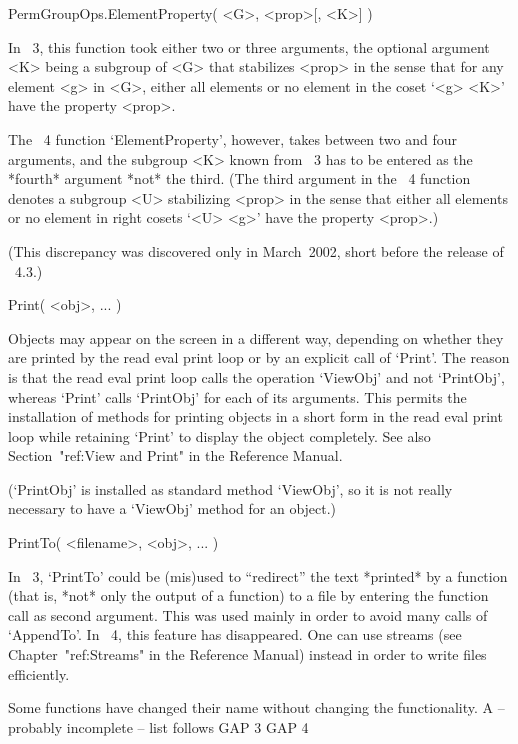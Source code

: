 \>PermGroupOps.ElementProperty( <G>, <prop>[, <K>] )

In {\GAP}~3, this function took either two or three arguments,
the optional argument <K> being a subgroup of <G> that stabilizes <prop>
in the sense that for any element <g> in <G>,
either all elements or no element in the coset `<g> \* <K>' have the
property <prop>.

The {\GAP}~4 function `ElementProperty', however,
takes between two and four arguments,
and the subgroup <K> known from {\GAP}~3 has to be entered as the *fourth*
argument *not* the third.
(The third argument in the {\GAP}~4 function denotes a subgroup <U>
stabilizing <prop> in the sense that either all elements or no element
in right cosets `<U> \* <g>' have the property <prop>.)

(This discrepancy was discovered only in March~2002,
short before the release of {\GAP}~4.3.)


\>Print( <obj>, ... )

Objects may appear on the screen in a different way,
depending on whether they are printed by the read eval print loop
or by an explicit call of `Print'.
The reason is that the read eval print loop calls the operation `ViewObj'
and not `PrintObj', whereas `Print' calls `PrintObj' for each of its
arguments.
This permits the installation of methods for printing objects in a short form
in the read eval print loop while retaining `Print' to display
the object completely.
See also Section~"ref:View and Print" in the Reference Manual.

(`PrintObj' is installed as standard method `ViewObj', so it is
not really necessary to have a `ViewObj' method for an object.)

\>PrintTo( <filename>, <obj>, ... )

In {\GAP}~3, `PrintTo' could be (mis)used to ``redirect'' the text
*printed* by a function (that is, *not* only the output of a function)
to a file by entering the function call as second argument.
This was used mainly in order to avoid many calls of `AppendTo'.
In {\GAP}~4, this feature has disappeared.
One can use streams (see Chapter~"ref:Streams" in the Reference Manual)
instead in order to write files efficiently.



Some functions have changed their name without changing the
functionality.
A -- probably incomplete -- list follows
\begintt
    GAP 3                   GAP 4

